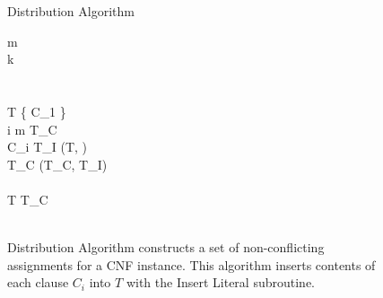 
\begin{figure}[htbp]
\begin{center}

	\begin{pseudocode}{Distribution Algorithm}{\phi}
	
	m \\
	k \\
	\\
	\\
	T \GETS \{ C_1 \} \\
	
	\FOR i   m \DO
		\BEGIN 
			T_C \GETS \emptyset \\
		\FOREACH {} \ell {} C_i \DO
			\BEGIN
				T_I \GETS {}(T, \ell)\\
				T_C \GETS {}(T_C, T_I)\\
			\END\\
			T \GETS T_C\\
		\END
	\\
	\end{pseudocode}

\caption{{\sc Distribution Algorithm} constructs a set of non-conflicting assignments for a CNF instance.  This algorithm inserts contents of each clause $C_i$ into $T$ with the {\sc Insert Literal} subroutine.}
\label{distributionAlgorithm}
\end{center}
\end{figure}

